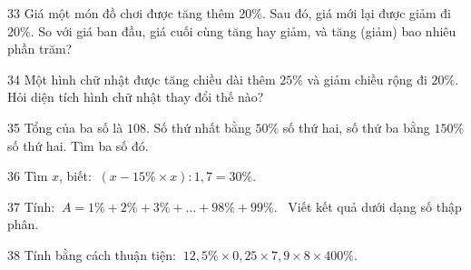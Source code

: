 \gap
\begin{probbox}{33}{}
Giá một món đồ chơi được tăng thêm $20\%$. Sau đó, giá mới lại được giảm đi $20\%$. So với giá ban đầu, giá cuối cùng tăng hay giảm, và tăng (giảm) bao nhiêu phần trăm?
\end{probbox}
\gap
\begin{probbox}{34}{}
Một hình chữ nhật được tăng chiều dài thêm $25\%$ và giảm chiều rộng đi $20\%$. Hỏi diện tích hình chữ nhật thay đổi thế nào?
\end{probbox}
\gap
\begin{probbox}{35}{}
Tổng của ba số là $108$. Số thứ nhất bằng $50\%$ số thứ hai, số thứ ba bằng $150\%$ số thứ hai. Tìm ba số đó.
\end{probbox}
\gap
\begin{probbox}{36}{}
Tìm $x$, biết: $\ (x-15\%\times x):1{,}7=30\%$.
\end{probbox}
\gap
\begin{probbox}{37}{}
Tính: $\ A=1\%+2\%+3\%+\dots+98\%+99\%$. \ Viết kết quả dưới dạng số thập phân.
\end{probbox}
\gap
\begin{probbox}{38}{}
Tính bằng cách thuận tiện: $\ 12{,}5\%\times0{,}25\times7{,}9\times8\times400\%$.
\end{probbox}
